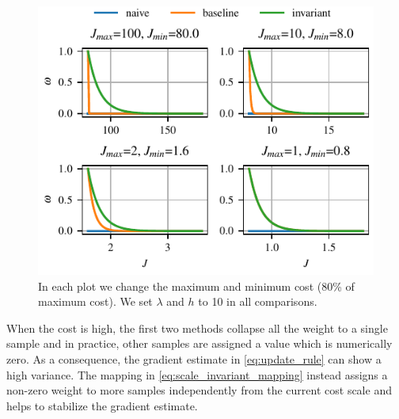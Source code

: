 \begin{figure}[t]
    \centering
    \includegraphics{figures/likelihood_mapping.pdf}
    \caption{In each plot we change the maximum and minimum cost ($80$\% of maximum cost). We set $\lambda$ and $h$ to 10 in all comparisons.}
    \label{fig:exponential_mapping_comparison}
\end{figure}

When the cost is high, the first two methods collapse all the weight to a single sample and in practice, other samples are assigned a value which is numerically zero. As a consequence, the gradient estimate in \eqref{eq:update_rule} can show a high variance. The mapping in \eqref{eq:scale_invariant_mapping} instead assigns a non-zero weight to more samples independently from the current cost scale and helps to stabilize the gradient estimate.

